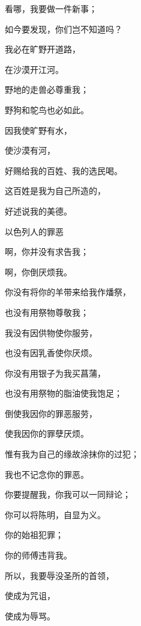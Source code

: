 {\par }{\Q {}看哪，我要做一件新事；
\par }{\Q 如今要发现，你们岂不知道吗？
\par }{\Q 我必在旷野开道路，
\par }{\Q 在沙漠开江河。
\par }{\Q {}野地的走兽必尊重我；
\par }{\Q 野狗和鸵鸟也必如此。
\par }{\Q 因我使旷野有水，
\par }{\Q 使沙漠有河，
\par }{\Q 好赐给我的百姓、我的选民喝。
\par }{\Q {}这百姓是我为自己所造的，
\par }{\Q 好述说我的美德。
\par }{\SH 以色列人的罪恶
\par }{\Q {}啊，你并没有求告我；
\par }{啊，你倒厌烦我。
\par }{\Q {}你没有将你的羊带来给我作燔祭，
\par }{\Q 也没有用祭物尊敬我；
\par }{\Q 我没有因供物使你服劳，
\par }{\Q 也没有因乳香使你厌烦。
\par }{\Q {}你没有用银子为我买菖蒲，
\par }{\Q 也没有用祭物的脂油使我饱足；
\par }{\Q 倒使我因你的罪恶服劳，
\par }{\Q 使我因你的罪孽厌烦。
\par }{\BB \par }{\Q {}惟有我为自己的缘故涂抹你的过犯；
\par }{\Q 我也不记念你的罪恶。
\par }{\Q {}你要提醒我，你我可以一同辩论；
\par }{\Q 你可以将{}陈明，自显为义。
\par }{\Q {}你的始祖犯罪；
\par }{\Q 你的师傅违背我。
\par }{\Q {}所以，我要辱没圣所的首领，
\par }{\Q 使{}成为咒诅，
\par }{\Q 使{}成为辱骂。

}
